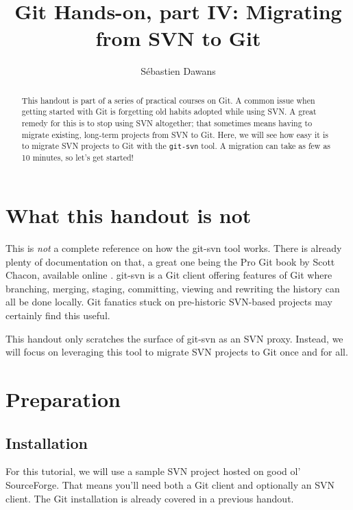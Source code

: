 \documentclass{../../common/tufte-latex/tufte-handout}
\title{Git Hands-on, part IV: Migrating from SVN to Git}
\author{S\'ebastien Dawans}
\begin{document}
\maketitle%

\begin{abstract}
\noindent
This handout is part of a series of practical courses on Git.
A common issue when getting started with Git is forgetting old habits adopted while using SVN.
A great remedy for this is to stop using SVN altogether; that sometimes means having to migrate existing, long-term projects from SVN to Git.
Here, we will see how easy it is to migrate SVN projects to Git with the \texttt{git-svn} tool.
A migration can take as few as 10 minutes, so let's get started!
\end{abstract}

\section{What this handout is not}

This is \textit{not} a complete reference on how the git-svn tool works.
There is already plenty of documentation on that, a great one being the Pro Git book by Scott Chacon, available online \cite{git-scm-ch8}.
git-svn is a Git client offering features of Git where branching, merging, staging, committing, viewing and rewriting the history can all be done locally.
Git fanatics stuck on pre-historic SVN-based projects may certainly find this useful.

This handout only scratches the surface of git-svn as an SVN proxy.
Instead, we will focus on leveraging this tool to migrate SVN projects to Git once and for all.

\section{Preparation}

\subsection{Installation}

For this tutorial, we will use a sample SVN project hosted on good ol' SourceForge. 
That means you'll need both a Git client and optionally an SVN client.
The Git installation is already covered in a previous handout.
\end{document}
